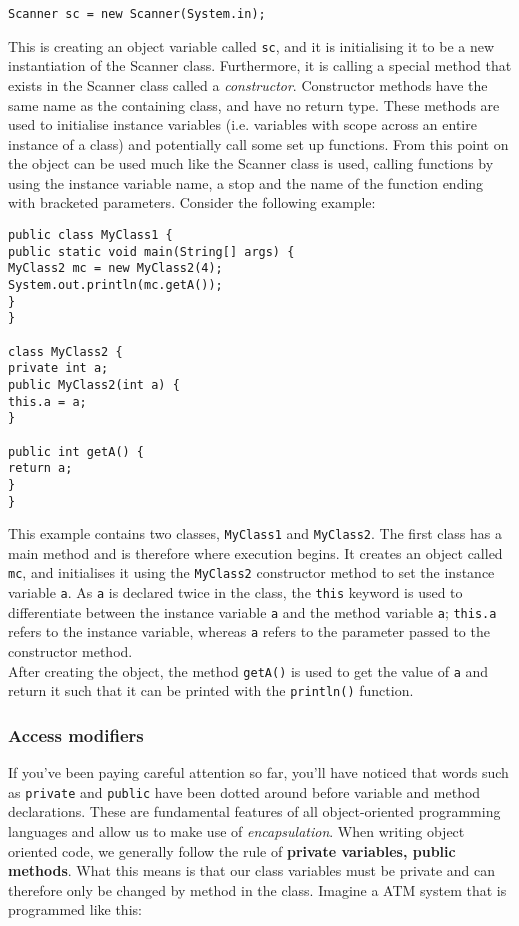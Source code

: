 \begin{verbatim}
Scanner sc = new Scanner(System.in);
\end{verbatim}

\noindent
This is creating an object variable called {\tt sc}, and it is initialising it to be a new instantiation of the Scanner class. Furthermore, it is calling a special method that exists in the Scanner class called a \emph{constructor}. Constructor methods have the same name as the containing class, and have no return type. These methods are used to initialise instance variables (i.e. variables with scope across an entire instance of a class) and potentially call some set up functions. From this point on the object can be used much like the Scanner class is used, calling functions by using the instance variable name, a stop and the name of the function ending with bracketed parameters. Consider the following example:

\begin{verbatim}
public class MyClass1 {
public static void main(String[] args) {
MyClass2 mc = new MyClass2(4);
System.out.println(mc.getA());
}
}

class MyClass2 {
private int a;
public MyClass2(int a) {
this.a = a;
}

public int getA() {
return a;
}
}
\end{verbatim}

\noindent
This example contains two classes, {\tt MyClass1} and {\tt MyClass2}. The first class has a main method and is therefore where execution begins. It creates an object called {\tt mc}, and initialises it using the {\tt MyClass2} constructor method to set the instance variable {\tt a}. As {\tt a} is declared twice in the class, the {\tt this} keyword is used to differentiate between the instance variable {\tt a} and the method variable {\tt a}; {\tt this.a} refers to the instance variable, whereas {\tt a} refers to the parameter passed to the constructor method.\\

\noindent
After creating the object, the method {\tt getA()} is used to get the value of {\tt a} and return it such that it can be printed with the {\tt println()} function.

\subsubsection*{Access modifiers}

If you've been paying careful attention so far, you'll have noticed that words such as {\tt private} and {\tt public} have been dotted around before variable and method declarations. These are fundamental features of all object-oriented programming languages and allow us to make use of \emph{encapsulation}. When writing object oriented code, we generally follow the rule of {\bf private variables, public methods}. What this means is that our class variables must be private and can therefore only be changed by method in the class. Imagine a ATM system that is programmed like this:


